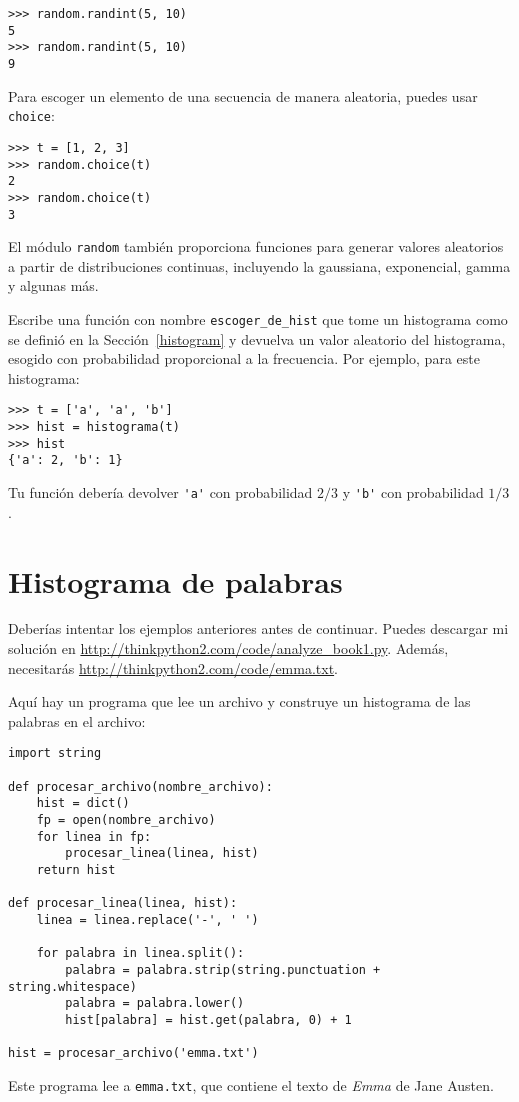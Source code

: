 \documentclass[10pt]{book}
\begin{document}
\begin{verbatim}
>>> random.randint(5, 10)
5
>>> random.randint(5, 10)
9
\end{verbatim}
%
Para escoger un elemento de una secuencia de manera aleatoria, puedes usar
{\tt choice}:

\begin{verbatim}
>>> t = [1, 2, 3]
>>> random.choice(t)
2
>>> random.choice(t)
3
\end{verbatim}
%
El módulo {\tt random} también proporciona funciones para generar
valores aleatorios a partir de distribuciones continuas, incluyendo
la gaussiana, exponencial, gamma y algunas más.

\begin{exercise}

Escribe una función con nombre \verb"escoger_de_hist" que tome
un histograma como se definió en la Sección~\ref{histogram} y devuelva un
valor aleatorio del histograma, esogido con probabilidad
proporcional a la frecuencia.  Por ejemplo, para este histograma:

\begin{verbatim}
>>> t = ['a', 'a', 'b']
>>> hist = histograma(t)
>>> hist
{'a': 2, 'b': 1}
\end{verbatim}
%
Tu función debería devolver \verb"'a'" con probabilidad $2/3$ y \verb"'b'"
con probabilidad $1/3$.
\end{exercise}


\section{Histograma de palabras}

Deberías intentar los ejemplos anteriores antes de continuar.
Puedes descargar mi solución en
 \url{http://thinkpython2.com/code/analyze_book1.py}.  Además,
necesitarás \url{http://thinkpython2.com/code/emma.txt}.

Aquí hay un programa que lee un archivo y construye un histograma de las
palabras en el archivo:

\begin{verbatim}
import string

def procesar_archivo(nombre_archivo):
    hist = dict()
    fp = open(nombre_archivo)
    for linea in fp:
        procesar_linea(linea, hist)
    return hist

def procesar_linea(linea, hist):
    linea = linea.replace('-', ' ')

    for palabra in linea.split():
        palabra = palabra.strip(string.punctuation + string.whitespace)
        palabra = palabra.lower()
        hist[palabra] = hist.get(palabra, 0) + 1

hist = procesar_archivo('emma.txt')
\end{verbatim}
%
Este programa lee a {\tt emma.txt}, que contiene el texto de {\em
  Emma} de Jane Austen.
\end{document}
